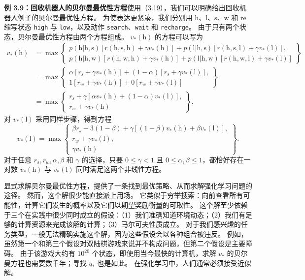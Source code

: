 \documentclass[UTF8,12pt,a4paper,fontset=fandol]{ctexart}
\begin{document}
\noindent\textbf{例 3.9：回收机器人的贝尔曼最优性方程}\quad 使用（3.19），我们可以明确给出回收机器人例子的贝尔曼最优性方程。
为使表达更紧凑，我们分别用 $\mathrm{h}$、$\mathrm{l}$、$\mathrm{s}$、$\mathrm{w}$ 和 $\mathrm{re}$ 缩写状态 \texttt{high} 与 \texttt{low}，以及动作 \texttt{search}、\texttt{wait} 和 \texttt{recharge}。
由于只有两个状态，贝尔曼最优性方程由两个方程组成。
$v_*(\mathrm{h})$ 的方程可以写为
\[
\begin{aligned}
v_*(\mathrm{h})
&=\max\left\{
\begin{array}{l}
p(\mathrm{h}|\mathrm{h},\mathrm{s})[r(\mathrm{h},\mathrm{s},\mathrm{h})+\gamma v_*(\mathrm{h})]
+p(\mathrm{l}|\mathrm{h},\mathrm{s})[r(\mathrm{h},\mathrm{s},\mathrm{l})+\gamma v_*(\mathrm{l})],\\
p(\mathrm{h}|\mathrm{h},\mathrm{w})[r(\mathrm{h},\mathrm{w},\mathrm{h})+\gamma v_*(\mathrm{h})]
+p(\mathrm{l}|\mathrm{h},\mathrm{w})[r(\mathrm{h},\mathrm{w},\mathrm{l})+\gamma v_*(\mathrm{l})]
\end{array}
\right\}\\
&=\max\left\{
\begin{array}{l}
\alpha[r_s+\gamma v_*(\mathrm{h})]+(1-\alpha)[r_s+\gamma v_*(\mathrm{l})],\\
1[r_w+\gamma v_*(\mathrm{h})]+0[r_w+\gamma v_*(\mathrm{l})]
\end{array}
\right\}\\
&=\max\left\{
\begin{array}{l}
r_s+\gamma[\alpha v_*(\mathrm{h})+(1-\alpha)v_*(\mathrm{l})],\\
r_w+\gamma v_*(\mathrm{h})
\end{array}
\right\}.
\end{aligned}
\]
对 $v_*(\mathrm{l})$ 采用同样步骤，得到方程
\[
v_*(\mathrm{l})=\max\left\{
\begin{array}{l}
\beta r_s-3(1-\beta)+\gamma[(1-\beta)v_*(\mathrm{h})+\beta v_*(\mathrm{l})],\\
r_w+\gamma v_*(\mathrm{l}),\\
\gamma v_*(\mathrm{h})
\end{array}
\right\}.
\]
对于任意 $r_s,r_w,\alpha,\beta$ 和 $\gamma$ 的选择，只要 $0\leq\gamma<1$ 且 $0\leq\alpha,\beta\leq1$，都恰好存在一对数 $v_*(\mathrm{h})$ 与 $v_*(\mathrm{l})$ 同时满足这两个非线性方程。

显式求解贝尔曼最优性方程，提供了一条找到最优策略、从而求解强化学习问题的途径。
然而，这个解很少能直接派上用场。
它类似于穷举搜索：向前查看所有可能性，计算它们发生的概率以及它们以期望奖励衡量的可取性。
这个解至少依赖于三个在实践中很少同时成立的假设：（1）我们准确知道环境动态；（2）我们有足够的计算资源来完成该解的计算；（3）马尔可夫性质成立。
对于我们感兴趣的任务类型，一般无法精确实施这个解，因为这些假设会以各种组合被违反。
例如，虽然第一个和第三个假设对双陆棋游戏来说并不构成问题，但第二个假设是主要障碍。
由于该游戏大约有 $10^{20}$ 个状态，即使用当今最快的计算机，求解 $v_*$ 的贝尔曼方程也需要数千年；寻找 $q_*$ 也是如此。
在强化学习中，人们通常必须接受近似解。
\end{document}
